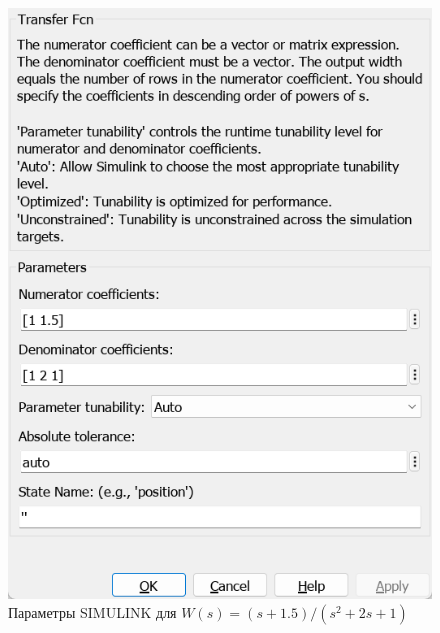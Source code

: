 \documentclass[a4paper, 12pt]{article}
\begin{document}
    \begin{figure}[H]
        \centering
        \includegraphics[scale=0.6]{task2_tfcn_window.png}
        \captionsetup{skip=0pt}
        \caption{Параметры SIMULINK для $W(s)=(s+1.5)/(s^2+2s+1)$}
        \label{fig:task2_tfcn_window}
    \end{figure}
\end{document}
